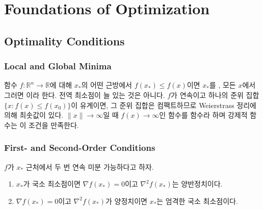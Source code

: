 \chapter{Foundations of Optimization}
\label{ch:optimization-basics}


\section{Optimality Conditions}
\label{sec:optimality}

\subsection{Local and Global Minima}

함수 $f:\mathbb R^n\to\mathbb R$에 대해 $x_\ast$의 어떤 근방에서 $f(x_\ast)\le f(x)$이면 $x_\ast$를 , 모든 $x$에서 그러면 이라 한다. 전역 최소점이 늘 있는 것은 아니다. $f$가 연속이고 하나의 준위 집합 $\{x:f(x)\le f(x_0)\}$이 유계이면, 그 준위 집합은 컴팩트하므로 Weierstrass 정리에 의해 최솟값이 있다. $\|x\|\to\infty$일 때 $f(x)\to\infty$인 함수를  함수라 하며 강제적 함수는 이 조건을 만족한다.

\subsection{First- and Second-Order Conditions}

\begin{theorem}
\label{thm:optimality}
$f$가 $x_\ast$ 근처에서 두 번 연속 미분 가능하다고 하자.
\begin{enumerate}
\item $x_\ast$가 국소 최소점이면 $\nabla f(x_\ast)=0$이고 $\nabla^2f(x_\ast)$는 양반정치이다.
\item $\nabla f(x_\ast)=0$이고 $\nabla^2f(x_\ast)$가 양정치이면 $x_\ast$는 엄격한 국소 최소점이다.
\end{enumerate}
\end{theorem}

